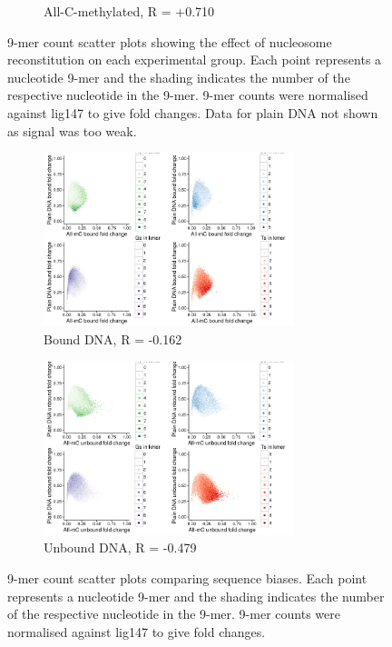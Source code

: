 \documentclass[parskip=full, numbers=noenddot]{scrreprt}
\begin{document}
\begin{figure}[htb]
\begin{subfigure}[htb]{0.8\textwidth}
    \caption{All-C-methylated, R = +0.710}
    \label{fig:kmer_bound_all}
  \end{subfigure}
  \caption{9-mer count scatter plots showing the effect of nucleosome reconstitution on each experimental group.  Each point represents a nucleotide 9-mer and the shading indicates the number of the respective nucleotide in the 9-mer.  9-mer counts were normalised against lig147 to give fold changes.  Data for plain DNA not shown as signal was too weak.}
  \label{fig:kmer_bound}
\end{figure}

\begin{figure}[htb]
  \centering
  \begin{subfigure}[htb]{0.8\textwidth}
    \centering
    \includegraphics[width=0.8\textwidth]{kmer_plainbXallb}
    \caption{Bound DNA, R = -0.162}
    \label{fig:kmer_bias_bound}
  \end{subfigure}
  \begin{subfigure}[htb]{0.8\textwidth}
    \centering
    \includegraphics[width=0.8\textwidth]{kmer_plainubXallub}
    \caption{Unbound DNA, R = -0.479}
    \label{fig:kmer_bias_unbound}
  \end{subfigure}
  \caption{9-mer count scatter plots comparing sequence biases.  Each point represents a nucleotide 9-mer and the shading indicates the number of the respective nucleotide in the 9-mer.  9-mer counts were normalised against lig147 to give fold changes.}
  \label{fig:kmer_bias}
\end{figure}
\end{document}
